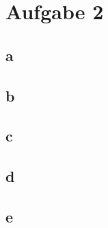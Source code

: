 

\section{Aufgabe 2}

\subsection{a}

\subsection{b}

\subsection{c}

\subsection{d}

\subsection{e}

